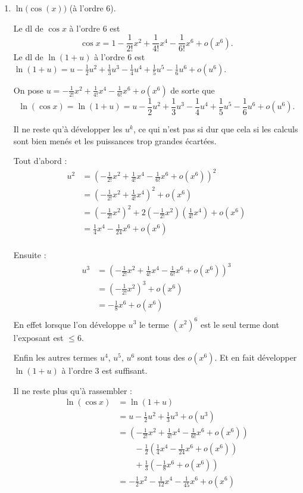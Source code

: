 \documentclass[11pt,a4paper]{article}
\renewcommand{\le}{\leqslant} \renewcommand{\leq}{\leqslant}
\begin{document}
\begin{enumerate}
  \item $\ln \big(\cos(x)\big)$ (à l'ordre $6$).

Le dl de $\cos x$ à l'ordre $6$ est
$$\cos x = 1 - \frac{1}{2!} x^2 + \frac{1}{4!}x^4 - \frac{1}{6!}x^6 + o(x^6).$$
Le dl de $\ln(1+u)$ à l'ordre $6$ est
$\ln(1+u)=u-\frac12u^2+\frac13u^3-\frac14u^4+\frac15u^5-\frac16u^6+o(u^6)$.

On pose $u= - \frac{1}{2!} x^2 + \frac{1}{4!}x^4 - \frac{1}{6!}x^6 + o(x^6)$ de sorte que
$$\ln(\cos x) = \ln (1+u)=u-\frac12u^2+\frac13u^3-\frac14u^4+\frac15u^5-\frac16u^6+o(u^6).$$

Il ne reste qu'à développer les $u^k$, ce qui n'est pas si dur que cela si les calculs sont bien menés et 
les puissances trop grandes écartées.

Tout d'abord :
\begin{align*}
u^2
  & = \left(- \frac{1}{2!} x^2 + \frac{1}{4!}x^4 - \frac{1}{6!}x^6 + o(x^6)\right)^2 \\
  & = \left(- \frac{1}{2!} x^2 + \frac{1}{4!}x^4 \right)^2 + o(x^6) \\
  & = \left(- \frac{1}{2!} x^2\right)^2 + 2 \left(- \frac{1}{2!} x^2\right) \left(\frac{1}{4!}x^4 \right) + o(x^6) \\
  & = \frac14 x^4 - \frac1{24} x^6 + o(x^6) \\
\end{align*}

Ensuite :
\begin{align*}
u^3 
  & = \left(- \frac{1}{2!} x^2 + \frac{1}{4!}x^4 - \frac{1}{6!}x^6 + o(x^6)\right)^3 \\
  & = \left(- \frac{1}{2!} x^2 \right)^3 + o(x^6) \\
  & =  -\frac18 x^6 + o(x^6) \\
\end{align*}
En effet lorsque l'on développe $u^3$ le terme $(x^2)^6$ est le seul terme dont l'exposant est $\le 6$.

Enfin les autres termes $u^4$, $u^5$, $u^6$ sont tous des $o(x^6)$. Et en fait développer $\ln(1+u)$ à l'ordre $3$ est suffisant.

Il ne reste plus qu'à rassembler :
\begin{align*}
\ln(\cos x) 
  & = \ln (1+u) \\
  & = u-\frac12u^2+\frac13u^3+o(u^3) \\
  & = \left(- \frac{1}{2!} x^2 + \frac{1}{4!}x^4 - \frac{1}{6!}x^6 + o(x^6)\right)\\
  & \qquad   -\frac12 \left(\frac14 x^4 - \frac{1}{24} x^6 + o(x^6)\right) \\
  & \qquad   +\frac13 \left(-\frac18 x^6 + o(x^6)\right)\\
  & = - \frac{1}{2} x^2 -\frac{1}{12}x^4 -\frac{1}{45}x^6  + o(x^6)\\
\end{align*}


\end{enumerate}
\end{document}
